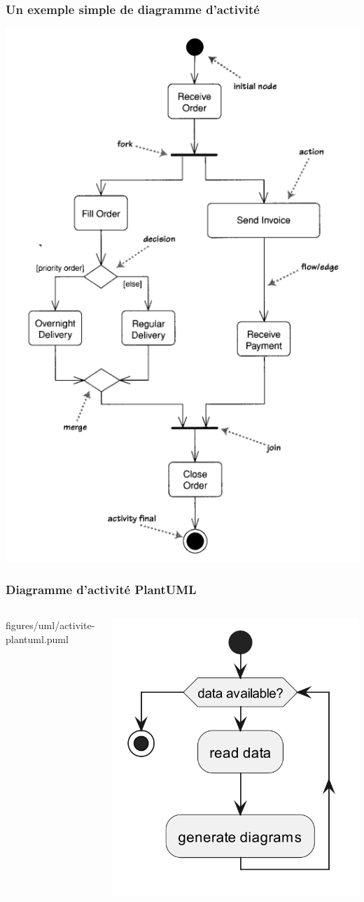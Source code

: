 \begin{frame}
    \frametitle{Un exemple simple de diagramme d'activité}
    \centering
    \includegraphics[height=0.5\linewidth]{figures/uml/activite-exemple}
\end{frame}

\begin{frame}
    \frametitle{Diagramme d'activité PlantUML}
    \begin{columns}
        \begin{column}{0.4\textwidth}
            
            {figures/uml/activite-plantuml.puml}
        \end{column}
        \begin{column}{0.6\textwidth}
            \centering
            \includegraphics[height=0.8\linewidth]{figures/uml/activite-plantuml}
        \end{column}
    \end{columns}
\end{frame}

